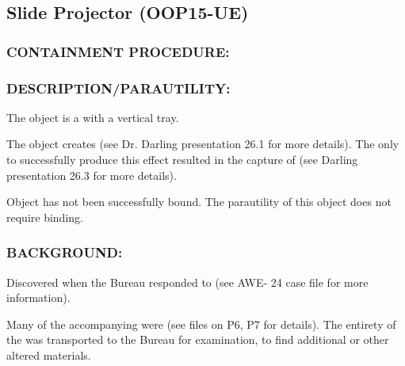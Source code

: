 \subsection*{Slide Projector (OOP15-UE)}
\subsubsection*{CONTAINMENT PROCEDURE:}
\par {}
\subsubsection*{DESCRIPTION/PARAUTILITY:}
\par The object is a  with a
vertical tray.
\par The object creates  (see Dr.
Darling presentation 26.1 for more details). The only 
to successfully produce this effect resulted in the
capture of  (see Darling presentation 26.3 for more details).

\par Object has not been successfully bound. The parautility of this
object does not require binding.
\subsubsection*{BACKGROUND:}
\par Discovered when the Bureau responded to 
 (see AWE-
24 case file for more information).
\par Many of the accompanying  were  (see files on P6, P7 for details). The entirety of the 
was transported to the Bureau for examination, to find additional 
or other altered materials.